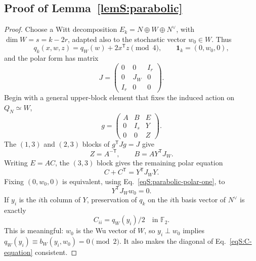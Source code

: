 \documentclass[journal,twocolumn]{IEEEtran}
\theoremstyle{definition}
\theoremstyle{plain}
\newcommand{\F}{\mathbb F}
\newcommand{\one}{\bm 1}
\begin{document}
\subsection{Proof of Lemma~\ref{lemS:parabolic}}
\label{app:proof-parabolic}

\begin{proof}
Choose a Witt decomposition
$E_k=N\oplus W\oplus N^\vee$, with
$\dim W=s=k-2r$, adapted also to the stochastic vector $w_0\in W$.  Thus
\begin{equation}
 q_k(x,w,z)=q_W(w)+2x^{\mathsf T}z\pmod4,
 \qquad \one_k=(0,w_0,0),
 \label{eqS:Witt-q}
\end{equation}
and the polar form has matrix
\begin{equation}
 J=\begin{pmatrix}0&0&I_r\\0&J_W&0\\I_r&0&0\end{pmatrix}.
 \label{eqS:Witt-J}
\end{equation}
Begin with a general upper-block element that fixes the induced action on
$Q_N\simeq W$,
\begin{equation}
 g=\begin{pmatrix}A&B&E\\0&I_s&Y\\0&0&Z\end{pmatrix}.
 \label{eqS:parabolic-block}
\end{equation}
The $(1,3)$ and $(2,3)$ blocks of $g^{\mathsf T}Jg=J$ give
\begin{equation}
 Z=A^{-\mathsf T},\qquad B=AY^{\mathsf T}J_W.
 \label{eqS:parabolic-polar-one}
\end{equation}
Writing $E=AC$, the $(3,3)$ block gives the remaining polar equation
\begin{equation}
 C+C^{\mathsf T}=Y^{\mathsf T}J_WY.
 \label{eqS:C-equation}
\end{equation}
Fixing $(0,w_0,0)$ is equivalent, using
Eq.~\eqref{eqS:parabolic-polar-one}, to
\begin{equation}
 Y^{\mathsf T}J_Ww_0=0.
 \label{eqS:parabolic-stochastic}
\end{equation}
If $y_i$ is the $i$th column of $Y$, preservation of $q_k$ on the $i$th
basis vector of $N^\vee$ is exactly
\begin{equation}
 C_{ii}=q_W(y_i)/2\quad\text{in }\F_2.
 \label{eqS:parabolic-diagonal}
\end{equation}
This is meaningful: $w_0$ is the Wu vector of $W$, so
$y_i\perp w_0$ implies $q_W(y_i)\equiv b_W(y_i,w_0)=0\pmod2$.
It also makes the diagonal of
Eq.~\eqref{eqS:C-equation} consistent.


\end{proof}
\end{document}
